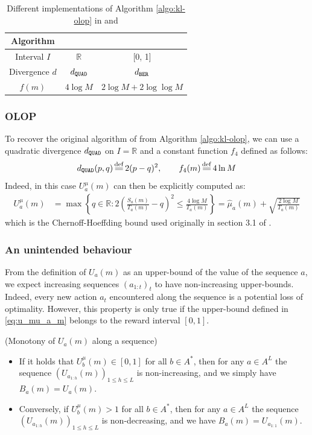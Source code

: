 \begin{table}[tp]
	\caption{Different implementations of Algorithm \ref{algo:kl-olop} in \OLOP and \KLOLOP}
	\label{tab:comparison}
	\centering
	\begin{tabular}{ccc}
		\toprule
		Algorithm & \OLOP & \KLOLOP \\
		\midrule
		Interval $I$ & $\mathbb{R}$ & [0, 1] \\
		Divergence $d$ & $d_\texttt{QUAD}$ & $d_\texttt{BER}$ \\
		$f(m)$ & $4 \log M$ & $2\log M + 2 \log\log M$\\
		\bottomrule
	\end{tabular}
\end{table}

\subsubsection{OLOP}
\label{sec:kl-olop-olop}
To recover the original \OLOP algorithm of \citet{Bubeck2010} from Algorithm \ref{algo:kl-olop}, we can use a quadratic divergence $d_\texttt{QUAD}$ on $I=\mathbb{R}$ and a constant function $f_4$ defined as follows:
\begin{equation*}
\dquad(p,q) \eqdef 2(p-q)^2,\qquad
f_4(m) \eqdef 4 \log M
\end{equation*}
Indeed, in this case $U^{\mu}_a(m)$ can then be explicitly computed as:
\begin{align*}
U^{\mu}_a(m) &= \max \left\{q\in \mathbb{R}: 2(\frac{S_a(m)}{T_a(m)} - q)^2 \leq \frac{4 \log M }{T_a(m)} \right\} = \hat{\mu}_a(m) + \sqrt{\frac{2 \log M}{T_a(m)}}
\end{align*}
which is the Chernoff-Hoeffding bound used originally in section 3.1 of \cite{Bubeck2010}.

\subsubsection{An unintended behaviour}
\label{sec:kl-olop-behaviour}
From the definition of $U_a(m)$ as an upper-bound of the value of the sequence $a$, we expect increasing sequences $(a_{1:t})_t$ to have non-increasing upper-bounds. Indeed, every new action $a_t$ encountered along the sequence is a potential loss of optimality.
However, this property is only true if the upper-bound defined in \eqref{eq:u_mu_a_m} belongs to the reward interval $[0,1]$.

\begin{lemma}(Monotony of $U_a(m)$ along a sequence)
	\label{lemma:seq_values}
	
	\begin{itemize}
		\item If it holds that $U^{\mu}_b(m) \in [0, 1]$ for all $b\in A^*$, then for any $a\in A^L$ the sequence $(U_{a_{1:h}}(m))_{1\leq h \leq L}$ is non-increasing, and we simply have $B_a(m) = U_a(m)$.
		\item Conversely, if $U^{\mu}_b(m) > 1$ for all $b\in A^*$, then for any $a\in A^L$ the sequence $(U_{a_{1:h}}(m))_{1\leq h \leq L}$ is non-decreasing, and we have $B_a(m) = U_{a_{1:1}}(m)$.
	\end{itemize}
\end{lemma}

